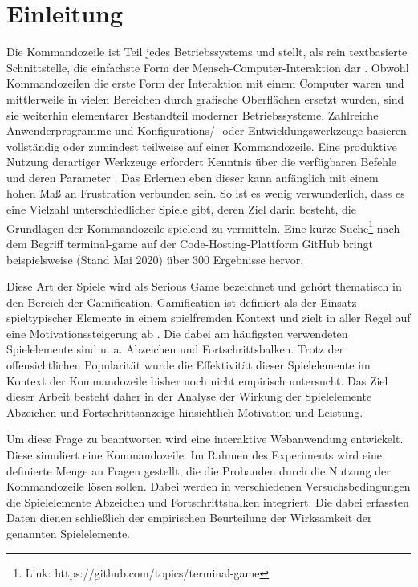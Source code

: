 \section{Einleitung}
Die Kommandozeile ist Teil jedes Betriebssystems und stellt, als rein textbasierte Schnittstelle, die einfachste Form der Mensch-Computer-Interaktion dar \cite{Kumar2005}. Obwohl Kommandozeilen die erste Form der Interaktion mit einem Computer waren und mittlerweile in vielen Bereichen durch grafische Oberflächen ersetzt wurden, sind sie weiterhin elementarer Bestandteil moderner Betriebssysteme. Zahlreiche Anwenderprogramme und Konfigurations/- oder Entwicklungswerkzeuge basieren vollständig oder zumindest teilweise auf einer Kommandozeile. Eine produktive Nutzung derartiger Werkzeuge erfordert Kenntnis über die verfügbaren Befehle und deren Parameter \cite[S.42]{Kumar2005}. Das Erlernen eben dieser kann anfänglich mit einem hohen Maß an Frustration verbunden sein. So ist es wenig verwunderlich, dass es eine Vielzahl unterschiedlicher Spiele gibt, deren Ziel darin besteht, die Grundlagen der Kommandozeile spielend zu vermitteln. Eine kurze Suche\footnote{Link: https://github.com/topics/terminal-game} nach dem Begriff \glqq terminal-game\grqq{} auf der Code-Hosting-Plattform GitHub bringt beispielsweise (Stand Mai  2020)  über  300  Ergebnisse  hervor. 

Diese Art der Spiele wird als Serious Game bezeichnet und gehört thematisch in den Bereich der Gamification. Gamification ist definiert als der Einsatz spieltypischer Elemente in einem spielfremden Kontext \cite{deterding_game_2011} und zielt in aller Regel auf eine Motivationssteigerung ab \cite{takahashi_gamification_2010}. Die  dabei  am  häufigsten  verwendeten  Spielelemente sind u. a. Abzeichen und Fortschrittsbalken. Trotz der offensichtlichen Popularität wurde die Effektivität dieser Spielelemente im Kontext der Kommandozeile bisher noch nicht empirisch untersucht. Das Ziel dieser Arbeit besteht daher in der Analyse der Wirkung der Spielelemente Abzeichen und Fortschrittsanzeige hinsichtlich Motivation und Leistung.

Um diese Frage zu beantworten wird eine interaktive Webanwendung entwickelt. Diese simuliert eine Kommandozeile. Im Rahmen des Experiments wird eine definierte Menge an Fragen gestellt, die die Probanden durch die Nutzung der Kommandozeile lösen sollen. Dabei  werden  in  verschiedenen  Versuchsbedingungen die Spielelemente Abzeichen und Fortschrittsbalken integriert. Die dabei erfassten Daten dienen schließlich der empirischen Beurteilung der Wirksamkeit der genannten Spielelemente.
